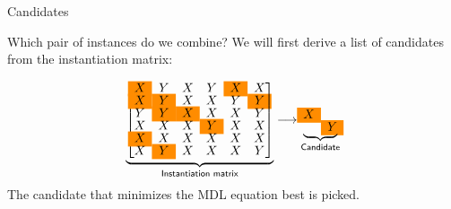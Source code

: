 \documentclass[11pt]{beamer}
\begin{document}
\begin{frame}{Candidates}

Which pair of instances do we combine? We will first derive a list of candidates from the instantiation matrix:

$$
\underbrace{
\begin{bmatrix}
\cellcolor{red!45!yellow} X & Y & X & Y & \cellcolor{red!45!yellow}X & X  \\[-.2em]
\cellcolor{red!45!yellow}X & \cellcolor{red!45!yellow}Y & X & X & Y & \cellcolor{red!45!yellow}Y  \\[-.2em]
Y & \cellcolor{red!45!yellow}Y & \cellcolor{red!45!yellow}X & X & X & Y  \\[-.2em]
X & X & X & \cellcolor{red!45!yellow}Y & X & X  \\[-.2em]
\cellcolor{red!45!yellow}X & X & X & X & X & X  \\[-.2em]
X & \cellcolor{red!45!yellow}Y & X & X & X & Y  \\
\end{bmatrix}}_{\textsf{Instantiation matrix}}
\longrightarrow
\underbrace{
\begin{matrix}
\cellcolor{red!45!yellow} X &   \\[-.2em]
 & \cellcolor{red!45!yellow}Y  \\[-.2em]
\end{matrix}}_{\textsf{Candidate}}
$$
\bigskip
The candidate that minimizes the MDL equation best is picked.

\end{frame}

\end{document}
